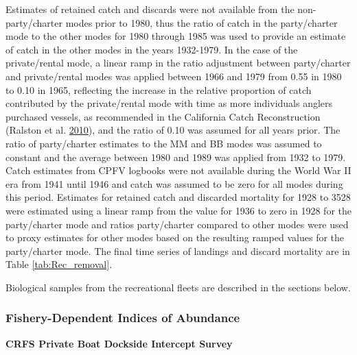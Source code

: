 \documentclass[12pt,]{article}
\begin{document}
Estimates of retained catch and discards were not available from the
non-party/charter modes prior to 1980, thus the ratio of catch in the
party/charter mode to the other modes for 1980 through 1985 was used to
provide an estimate of catch in the other modes in the years 1932-1979.
In the case of the private/rental mode, a linear ramp in the ratio
adjustment between party/charter and private/rental modes was applied
between 1966 and 1979 from 0.55 in 1980 to 0.10 in 1965, reflecting the
increase in the relative proportion of catch contributed by the
private/rental mode with time as more individuals anglers purchased
vessels, as recommended in the California Catch Reconstruction (Ralston
et al. \protect\hyperlink{ref-Ralston2010}{2010}), and the ratio of 0.10
was assumed for all years prior. The ratio of party/charter estimates to
the MM and BB modes was assumed to constant and the average between 1980
and 1989 was applied from 1932 to 1979. Catch estimates from CPFV
logbooks were not available during the World War II era from 1941 until
1946 and catch was assumed to be zero for all modes during this period.
Estimates for retained catch and discarded mortality for 1928 to 3528
were estimated using a linear ramp from the value for 1936 to zero in
1928 for the party/charter mode and ratios party/charter compared to
other modes were used to proxy estimates for other modes based on the
resulting ramped values for the party/charter mode. The final time
series of landings and discard mortality are in Table
\ref{tab:Rec_removal}.

Biological samples from the recreational fleets are described in the
sections below.

\subsubsection{Fishery-Dependent Indices of
Abundance}\label{fishery-dependent-indices-of-abundance}

\textbf{CRFS Private Boat Dockside Intercept Survey}
\end{document}
